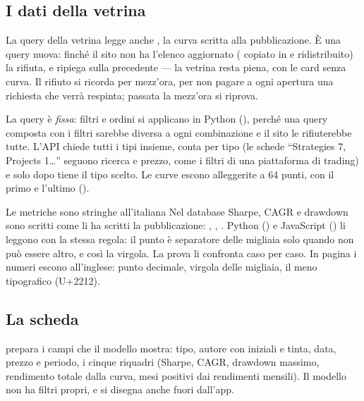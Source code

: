 \subsection{I dati della vetrina}

La query della vetrina legge anche , la curva
scritta alla pubblicazione. È una query nuova: finché il sito non ha
l'elenco aggiornato ( copiato in
 e ridistribuito) la rifiuta, e
 ripiega sulla precedente --- la vetrina
resta piena, con le card senza curva. Il rifiuto si ricorda per mezz'ora, per
non pagare a ogni apertura una richiesta che verrà respinta; passata la
mezz'ora si riprova.

La query è \emph{fissa}: filtri e ordini si applicano in Python
(), perché una query composta con i filtri sarebbe
diversa a ogni combinazione e il sito le rifiuterebbe tutte. L'API
 chiede tutti i tipi insieme, conta per
tipo (le schede \enquote{Strategies 7, Projects 1\ldots} seguono ricerca e
prezzo, come i filtri di una piattaforma di trading) e solo dopo tiene il tipo
scelto. Le curve escono alleggerite a \num{64} punti, con il primo e l'ultimo
().

\begin{attenzione}{Le metriche sono stringhe all'italiana}
Nel database Sharpe, CAGR e drawdown sono scritti come li ha scritti la
pubblicazione: , , . Python
() e JavaScript () li
leggono con la stessa regola: il punto è separatore delle migliaia solo
quando non può essere altro, e così la virgola. La prova li confronta caso per
caso. In pagina i numeri escono all'inglese: punto decimale, virgola delle
migliaia, il meno tipografico (U+2212).
\end{attenzione}

\subsection{La scheda}

 prepara i campi che il modello mostra:
tipo, autore con iniziali e tinta, data, prezzo e periodo, i cinque riquadri
(Sharpe, CAGR, drawdown massimo, rendimento totale dalla curva, mesi
positivi dai rendimenti mensili). Il modello non ha filtri propri, e si
disegna anche fuori dall'app.

